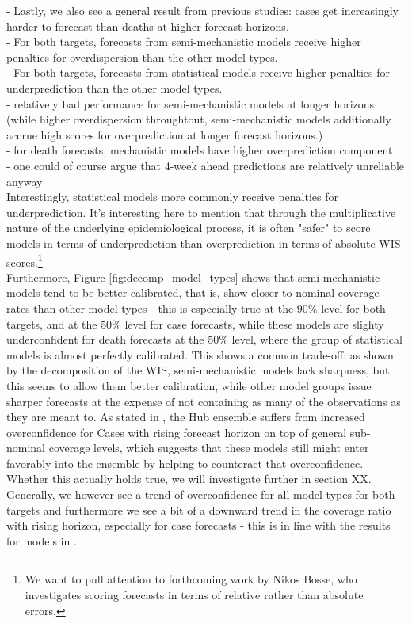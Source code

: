 - Lastly, we also see a general result from previous studies: cases get increasingly harder to forecast than deaths at higher forecast horizons.\\
- For both targets, forecasts from semi-mechanistic models receive higher penalties for overdispersion than the other model types.\\
- For both targets, forecasts from statistical models receive higher penalties for underprediction than the other model types.\\
- relatively bad performance for semi-mechanistic models at longer horizons (while higher overdispersion throughtout, semi-mechanistic models additionally accrue high scores for overprediction at longer forecast horizons.)\\
- for death forecasts, mechanistic models have higher overprediction component\\
- one could of course argue that 4-week ahead predictions are relatively unreliable anyway \\
Interestingly, statistical models more commonly receive penalties for underprediction. It's interesting here to mention that through the multiplicative nature of the underlying epidemiological process, it is often "safer" to score models in terms of underprediction than overprediction in terms of absolute WIS scores.\footnote{We want to pull attention to forthcoming work by Nikos Bosse, who investigates scoring forecasts in terms of relative rather than absolute errors.}  \\
Furthermore, Figure \ref{fig:decomp_model_types} shows that semi-mechanistic models tend to be better calibrated, that is, show closer to nominal coverage rates than other model types - this is especially true at the $90\%$ level for both targets, and at the $50\%$ level for case forecasts, while these models are slighty underconfident for death forecasts at the $50\%$ level, where the group of statistical models is almost perfectly calibrated. This shows a common trade-off: as shown by the decomposition of the WIS, semi-mechanistic models lack sharpness, but this seems to allow them better calibration, while other model groups issue sharper forecasts at the expense of not containing as many of the observations as they are meant to. As stated in \cite{sherratt_european_2022}, the Hub ensemble suffers from increased overconfidence for Cases with rising forecast horizon on top of general sub-nominal coverage levels, which suggests that these models still might enter favorably into the ensemble by helping to counteract that overconfidence. Whether this actually holds true, we will investigate further in section XX. Generally, we however see a trend of overconfidence for all model types for both targets and furthermore we see a bit of a downward trend in the coverage ratio with rising horizon, especially for case forecasts - this is in line with the results for models in \cite{sherratt_european_2022}. \\
